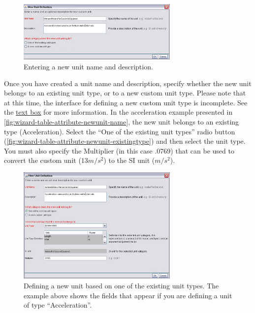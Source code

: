 \begin{figure}
  \centering
    \includegraphics[width=0.7\textwidth]{images/wizard-table-attribute-newunit-name.jpg}
  \caption{Entering a new unit name and description.}
  \label{fig:wizard-table-attribute-newunit-name}
\end{figure}

Once you have created a unit name and description, specify whether the
new unit belongs to an existing unit type, or to a new custom unit type.
Please note that at this time, the interface for defining a new custom
unit type is incomplete. See the \hyperref[box:custom-units]{text box}
for more information. In the acceleration example presented in
\autoref{fig:wizard-table-attribute-newunit-name}, the new unit belongs
to an existing type (Acceleration). Select the ``One of the existing
unit types'' radio button
(\autoref{fig:wizard-table-attribute-newunit-existingtype}) and then
select the unit type. You must also specify the Multiplier (in this case
.0769) that can be used to convert the custom unit ($13m/s^2$) to the SI
unit ($m/s^2$). 

\begin{figure}
  \centering
    \includegraphics[width=0.7\textwidth]{images/wizard-table-attribute-newunit-existingtype.jpg}
  \caption{Defining a new unit based on one of the existing unit types.
    The example above shows the fields that appear if you are defining a
    unit of type ``Acceleration''.}
  \label{fig:wizard-table-attribute-newunit-existingtype}
\end{figure}

